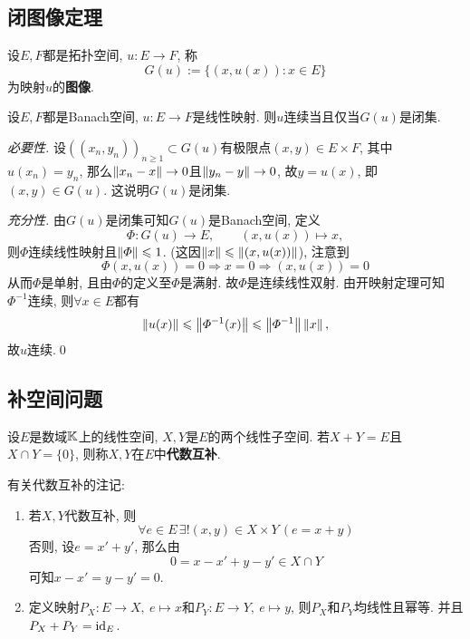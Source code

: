 	\subsection{闭图像定理}
	
	\begin{Definition}[图像]
	设$ E, F $都是拓扑空间, $ u : E\to F $, 称
	\[
	G(u):=\{ (x,u(x)) : x\in E \}
	\]
	为映射$ u $的\textbf{图像}.
	\end{Definition}
	
	\begin{Theorem}[闭图像定理]
	设$ E, F $都是Banach空间, $ u : E\to F $是线性映射. 则$ u $连续当且仅当$ G(u) $是闭集.
	\end{Theorem}
	\begin{Proof}
	\textsl{必要性.} 设$ ((x_n,y_n))_{n\geqslant 1}\subset G(u) $有极限点$ (x,y)\in E\times F $, 其中$ u(x_n)=y_n $, 那么$ \left\| x_n-x \right\|\to 0 $且$ \left\| y_n-y \right\|\to 0 $, 故$ y=u(x) $, 即$ (x,y)\in G(u) $. 这说明$ G(u) $是闭集.
	
	\textsl{充分性.} 由$ G(u) $是闭集可知$ G(u) $是Banach空间, 定义
	\[
	\varPhi : G(u)\to E,\qquad (x,u(x))\mapsto x,
	\]
	则$ \varPhi $连续线性映射且$ \left\| \varPhi \right\|\leqslant 1 $. (这因$ \left\| x \right\|\leqslant\left\| (x,u(x)) \right\| $), 注意到
	\[
	\varPhi(x,u(x))=0\Longrightarrow x=0\Longrightarrow (x,u(x))=0
	\]
	从而$ \varPhi $是单射, 且由$ \varPhi $的定义至$ \varPhi $是满射. 故$ \varPhi $是连续线性双射. 由开映射定理可知$ \varPhi^{-1} $连续, 则$ \forall x\in E $都有
	\[
	\left\| u(x) \right\|\leqslant\left\| \varPhi^{-1}(x) \right\|\leqslant\left\| \varPhi^{-1} \right\|\left\| x \right\|,
	\]
	故$ u $连续.\qed
	\end{Proof}
	
	\subsection{补空间问题}
	
	\begin{Definition}[代数互补]
	设$ E $是数域$ \mathbb{K} $上的线性空间, $ X, Y $是$ E $的两个线性子空间. 若$ X+Y=E $且$ X\cap Y=\{0\} $, 则称$ X, Y $在$ E $中\textbf{代数互补}.
	\end{Definition}
	
	\begin{Remark}
	有关代数互补的注记:
	\begin{enumerate}[(1)]
	\item 若$ X, Y $代数互补, 则
	\[
	\forall e\in E\,\exists!(x,y)\in X\times Y\,(e=x+y)
	\]
	否则, 设$ e=x'+y' $, 那么由
	\[
	0=x-x'+y-y'\in X\cap Y
	\]
	可知$ x-x'=y-y'=0 $.
	\item 定义映射$ P_X : E\to X,\ e\mapsto x $和$ P_Y : E\to Y,\ e\mapsto y $, 则$ P_X $和$ P_Y $均线性且幂等. 并且$ P_X+P_Y=\mathrm{id}_E $.
	\end{enumerate}
	\end{Remark}
	
